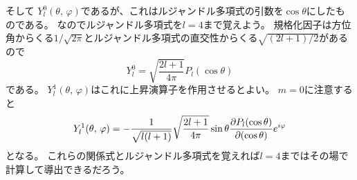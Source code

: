 \documentclass[../../master.tex]{subfiles}
\begin{document}

そして
\(Y_l^0(\theta,\,\varphi)\)であるが、これはルジャンドル多項式の引数を\(\cos\theta\)にしたものである。
なのでルジャンドル多項式を\(l=4\)まで覚えよう。
規格化因子は方位角からくる\(1/\sqrt{2\pi}\)とルジャンドル多項式の直交性からくる\(\sqrt{(2l+1)/2}\)があるので
\begin{equation}
	Y_l^0 = \sqrt{\frac{2l+1}{4\pi}} P_l(\cos\theta)
\end{equation}
である。
\(Y_l^1(\theta,\,\varphi)\)はこれに上昇演算子を作用させるとよい。
\(m=0\)に注意すると
\begin{equation}
	Y_l^1(\theta,\,\varphi) = -\frac{1}{\sqrt{l(l+1)}}\sqrt{\frac{2l+1}{4\pi}}\sin\theta\pdv{P_l(\cos\theta)}{(\cos\theta)}e^{i\varphi}
\end{equation}
となる。
これらの関係式とルジャンドル多項式を覚えれば\(l=4\)まではその場で計算して導出できるだろう。
\end{document}

